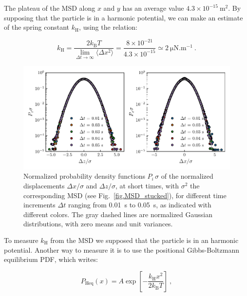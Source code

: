 The plateau of the MSD along  $x$ and $y$ has an average value   $4.3 \times 10 ^{-15} ~ \mathrm{m^2}$. By supposing that the particle is in a harmonic potential, we can make an estimate of the spring constant $k_\mathrm{H}$, using the relation:

\begin{equation}
	k_\mathrm{H} = \frac{2  k_\mathrm{B} T}{ \lim\limits_{\Delta t \rightarrow \infty }\langle \Delta x ^2 \rangle} = \frac{8 \times 10^{-21}}{4.3 \times 10 ^{-15}} \simeq 2 ~ \mathrm{\mu N . m^{-1}}~.
\end{equation}




\begin{figure}[H]
	\centering
	\includegraphics{02_body/chapter4/images/stucked_particle/P_xz_stucked.pdf}
	\caption{ Normalized probability density functions $P_i\,\sigma$ of the normalized displacements $\Delta x/\sigma$ and $\Delta z/\sigma$, at short times, with $\sigma^2$ the corresponding MSD (see Fig.~\ref{fig.MSD_stucked}), for different time increments $\Delta t$ ranging from 0.01~s to 0.05~s, as indicated with different colors. The gray dashed lines are normalized Gaussian distributions, with zero means and unit variances.}
	\label{fig.P_dxz_stucked}
\end{figure}

To measure $k_\mathrm{H}$ from the \gls{MSD} we supposed that the particle is in an harmonic potential. Another way to measure it is to use the positional Gibbs-Boltzmann equilibrium \gls{PDF}, which writes:

\begin{equation}
	P_\mathrm{Heq}(x) =A \exp \left[ -\frac{k_\mathrm{H}x^2}{2k_\mathrm{B}T} \right]~,
	\label{Peqstuck}
\end{equation}

